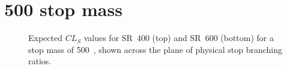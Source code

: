 \FloatBarrier

\newpage
\section{500 \texorpdfstring{\GeV}{GeV} stop mass}

\begin{figure}[ht]
  \centering
  \caption{
    Expected
    $CL_S$ values for SR~400 (top) and SR~600 (bottom) for a stop mass of
    500~\GeV,
    shown across the plane of physical stop branching ratios.
  }
\end{figure}


